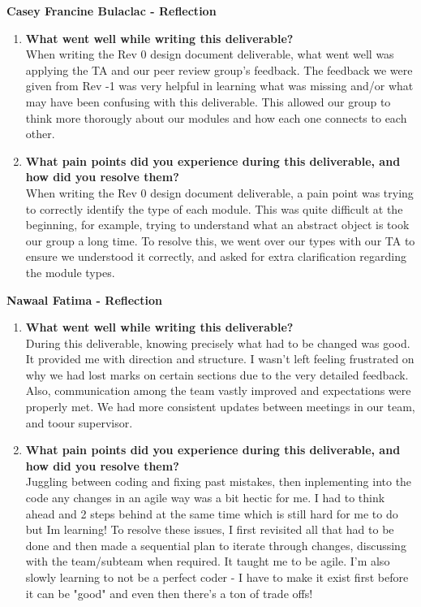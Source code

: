 \documentclass[12pt, titlepage]{article}
\begin{document}
\textbf{Casey Francine Bulaclac - Reflection}
\begin{enumerate}
  \item \textbf{What went well while writing this deliverable?} \\
    When writing the Rev 0 design document deliverable, what went
    well was applying
    the TA and our peer review group's feedback. The feedback we were
    given from Rev -1
    was very helpful in learning what was missing and/or what may
    have been confusing
    with this deliverable. This allowed our group to think more thorougly about
    our modules and how each one connects to each other.

  \item \textbf{What pain points did you experience during this
      deliverable, and how
    did you resolve them?} \\
    When writing the Rev 0 design document deliverable, a pain point
    was trying to
    correctly identify the type of each module. This was quite
    difficult at the beginning,
    for example, trying to understand what an abstract object is took
    our group a long
    time. To resolve this, we went over our types with our TA to
    ensure we understood it
    correctly, and asked for extra clarification regarding the module types.
\end{enumerate}

\textbf{Nawaal Fatima - Reflection}
\begin{enumerate}
  \item \textbf{What went well while writing this deliverable?} \\
  During this deliverable, knowing precisely what had to be changed was good. It provided me with direction and structure. 
  I wasn't left feeling frustrated on why we had lost marks on certain sections due to the very detailed feedback. Also, 
  communication among the team vastly improved and expectations were properly met. We had more consistent updates between meetings in 
  our team, and toour supervisor.

  \item \textbf{What pain points did you experience during this deliverable, and how
    did you resolve them?} \\
  Juggling between coding and fixing past mistakes, then inplementing into the code any changes in an agile way was a bit hectic for me. 
  I had to think ahead and 2 steps behind at the same time which is still hard for me to do but Im learning! To resolve these issues, 
  I first revisited all that had to be done and then made a sequential plan to iterate through changes, discussing with the team/subteam 
  when required. It taught me to be agile. I'm also slowly learning to not be a perfect coder - I have to make it exist first before it can 
  be "good" and even then there's a ton of trade offs! 
  
\end{enumerate}
\end{document}
